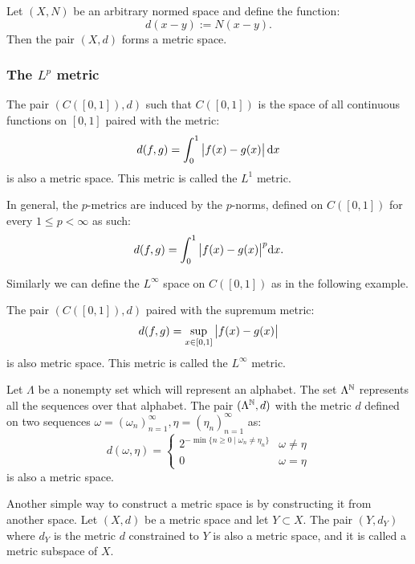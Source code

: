 \documentclass[11pt,a4paper]{article}
\begin{document}
\begin{example}
Let $(X, N)$ be an arbitrary normed space and define the function:
\[
  d(x - y) := N(x - y).
\] 
Then the pair $(X, d)$ forms a metric space.
\end{example}

\subsubsection{The \texorpdfstring{$L^p$}{} metric}

\begin{example}
The pair $(C\left([0,1]\right), d)$ such that $C([0,1])$ is the space of 
all continuous functions on $[0,1]$ paired with the metric:
\[
  d(f,g) = \int_{0}^{1}{\abs{f(x) - g(x)}\dx}
\]
is also a metric space. This metric is called the $L^1$ metric.
\end{example}

\begin{remark}
  In general, the $p$-metrics are induced by the $p$-norms, defined
  on $C\left([0,1]\right)$ for every $1 \le p < \infty$ as such:
  \[
    d(f,g) = \int_{0}^{1}{\abs{f(x) - g(x)}^p}\dx.
  \]
\end{remark}
Similarly we can define the $L^\infty$ space on $C\left([0,1]\right)$
as in the following example.
\begin{example}
The pair $(C([0,1]), d)$ paired with the supremum metric:
\[
  d(f,g) = \sup_{x \in [0,1]}{\left\lvert f(x) - g(x)\right\rvert}
\]
is also metric space. This metric is called the $L^\infty$ metric.
\end{example}

\begin{example}
Let $\Lambda$ be a nonempty set which will represent an alphabet.
The set $\Lambda^{\mathbb{N}}$ represents all the sequences over that alphabet.
The pair $(\Lambda^{\mathbb{N}}, d)$ with the metric $d$ defined on two sequences
$\omega = (\omega_n)_{n=1}^{\infty}, \eta = (\eta_n)_{n=1}^{\infty}$
as:
\[
  d(\omega, \eta) = \begin{cases}
    2^{-\min\{n \geq 0 \mid \omega_n \neq \eta_n\}} & 
    \omega \neq \eta \\
    0 & \omega = \eta
  \end{cases}
\]
is also a metric space.
\end{example}
\begin{example}
  Another simple way to construct a metric space is by constructing it
  from another space. Let $(X,d)$ be a metric space and let $Y \subset X$.
  The pair $(Y,d_Y)$ where $d_Y$ is the metric $d$ constrained to $Y$
  is also a metric space, and it is called a metric subspace of $X$.
\end{example}
\end{document}
